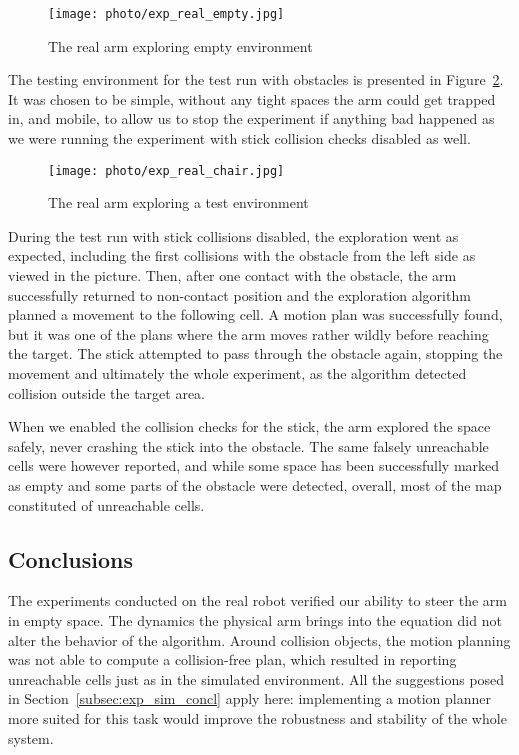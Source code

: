 \documentclass[buriama8_dp.tex]{subfiles}
\begin{document}
\begin{figure}[ht]
  \centering
  \texttt{[image: photo/exp\_real\_empty.jpg]}
  \caption{The real arm exploring empty environment}
  \label{fig:exp_real_empty} 
\end{figure}

The testing environment for the test run with obstacles is presented in Figure~\ref{fig:exp_real_chair}. It was chosen to be simple, without any tight spaces the arm could get trapped in, and mobile, to allow us to stop the experiment if anything bad happened as we were running the experiment with stick collision checks disabled as well.

\begin{figure}[ht]
  \centering
  \texttt{[image: photo/exp\_real\_chair.jpg]}
  \caption{The real arm exploring a test environment}
  \label{fig:exp_real_chair}
\end{figure}

During the test run with stick collisions disabled, the exploration went as expected, including the first collisions with the obstacle from the left side as viewed in the picture. Then, after one contact with the obstacle, the arm successfully returned to non-contact position and the exploration algorithm planned a movement to the following cell. A motion plan was successfully found, but it was one of the plans where the arm moves rather wildly before reaching the target. The stick attempted to pass through the obstacle again, stopping the movement and ultimately the whole experiment, as the algorithm detected collision outside the target area.

When we enabled the collision checks for the stick, the arm explored the space safely, never crashing the stick into the obstacle. The same falsely unreachable cells were however reported, and while some space has been successfully marked as empty and some parts of the obstacle were detected, overall, most of the map constituted of unreachable cells.

\subsection{Conclusions}
\label{subsec:label}

The experiments conducted on the real robot verified our ability to steer the arm in empty space. The dynamics the physical arm brings into the equation did not alter the behavior of the algorithm. Around collision objects, the motion planning was not able to compute a collision-free plan, which resulted in reporting unreachable cells just as in the simulated environment. All the suggestions posed in Section~\ref{subsec:exp_sim_concl} apply here: implementing a motion planner more suited for this task would improve the robustness and stability of the whole system.
\end{document}
